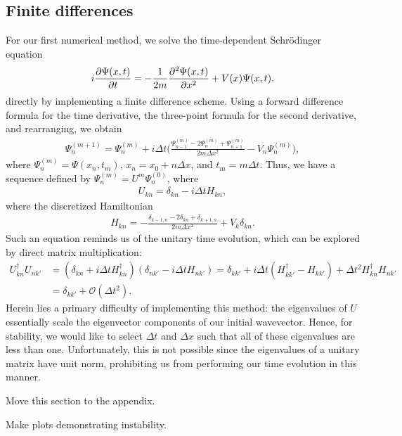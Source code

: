 \subsection{Finite differences}
\label{ssec:finite-differences}

For our first numerical method, we solve the time-dependent Schr\"{o}dinger equation 
\begin{align}
    i \pdv{\Psi(x,t)}{t} = -\frac{1}{2m} \pdv[2]{\Psi(x,t)}{x} + V(x) \Psi(x,t)
.\end{align}
directly by implementing a finite difference scheme.
Using a forward difference formula for the time derivative, the three-point formula for the second derivative, and rearranging, we obtain
\begin{align}
    \Psi_{n}^{(m + 1)} = \Psi_{n}^{(m)} + i \Delta t \Bigg( \frac{\Psi_{n-1}^{(m)} - 2 \Psi_{n}^{(m)} + \Psi_{n+1}^{(m)}}{2m \Delta x^2} - V_{n} \Psi_{n}^{(m)} \Bigg)
,\end{align}
where $\Psi_{n}^{(m)} = \Psi(x_n,t_{m})$, $x_{n} = x_0 + n \Delta x$, and $t_{m} = m \Delta t$.
Thus, we have a sequence defined by $\Psi_{n}^{(m)} = U^{m} \Psi_{n}^{(0)}$, where
\begin{align}
    U_{kn} = \delta_{kn} - i \Delta t H_{kn}
,\end{align}
where the discretized Hamiltonian
\begin{align}
    H_{kn} = -\frac{\delta_{k-1,n} - 2 \delta_{kn} + \delta_{k+1,n}}{2m \Delta x^2} + V_{k} \delta_{kn}
.\end{align}
Such an equation reminds us of the unitary time evolution, which can be explored by direct matrix multiplication:
\begin{align}
    U_{kn}^{\dagger} U_{nk'} &= ( \delta_{kn} + i \Delta t H_{kn}^{\dagger} ) ( \delta_{nk'} - i \Delta t H_{nk'} ) = \delta_{k k'} + i \Delta t ( H_{kk'}^{\dagger} - H_{kk'} ) + \Delta t^2 H_{kn}^{\dagger} H_{nk'} \nonumber \\
    &= \delta_{kk'} + \mathcal{O}(\Delta t^2)
.\end{align}
Herein lies a primary difficulty of implementing this method: the eigenvalues of $U$ essentially scale the eigenvector components of our initial wavevector.
Hence, for stability, we would like to select $\Delta t$ and $\Delta x$ such that all of these eigenvalues are less than one.
Unfortunately, this is not possible since the eigenvalues of a unitary matrix have unit norm, prohibiting us from performing our time evolution in this manner.

{\color{red} 
    Move this section to the appendix.

    Make plots demonstrating instability.
}


